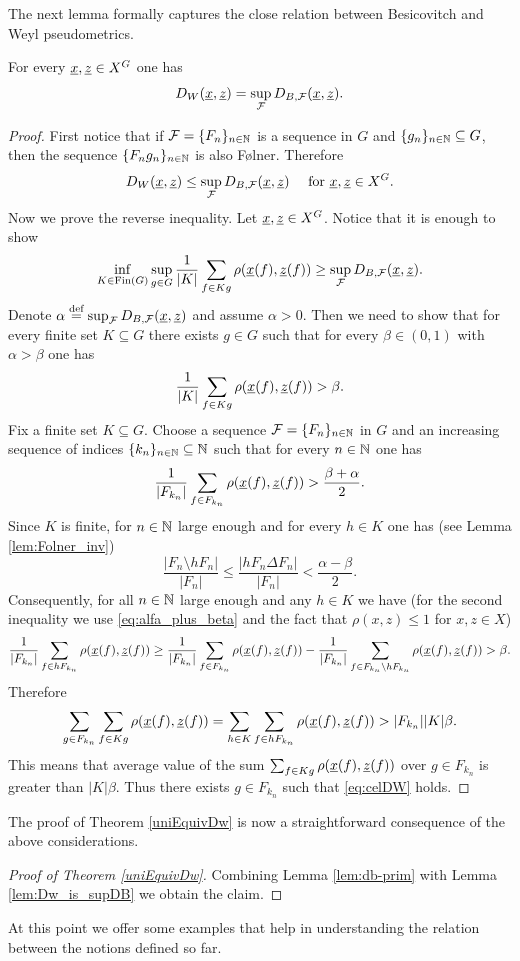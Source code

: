 \noindent The next lemma formally captures the close relation between Besicovitch and Weyl pseudometrics.

\begin{lem}\label{lem:Dw_is_supDB}
For every $\underline{x}, \underline{z}\in X^G$ one has
\[ 
D_W(\underline{x}, \underline{z})=\sup_{\operatorname{\mathcal{F}}}D_{B,\operatorname{\mathcal{F}}}(\underline{x}, \underline{z}).
\]
\end{lem}


\begin{proof}
First notice that if $\operatorname{\mathcal{F}}=\{F_n\}_{n\in\mathbb{N}}$ is a \Folner sequence in $G$ and  $\{g_n\}_{n\in\mathbb{N}}\subseteq G$, then the sequence $\{F_ng_n\}_{n\in\mathbb{N}}$ is also F{\o}lner. Therefore 
\[
D_W(\underline{x}, \underline{z})\leq\sup_{\operatorname{\mathcal{F}}}D_{B,\operatorname{\mathcal{F}}}(\underline{x}, \underline{z}) \quad \text{ for } \underline{x},\underline{z}\in X^G.
\]
Now we prove the reverse inequality. Let $\underline{x},\underline{z}\in X^G$. Notice that it is enough to show
\[
\inf_{K\in\operatorname{Fin}(G)}\sup_{g\in G}\frac{1}{ | K|} \sum_{f\in Kg}\rho(\underline{x}(f), \underline{z}(f)) \geq\sup_{\operatorname{\mathcal{F}}}D_{B,\operatorname{\mathcal{F}}}(\underline{x}, \underline{z}).
\]
Denote $\alpha\stackrel{\textup{def}}{=} \sup_{\operatorname{\mathcal{F}}}D_{B,\operatorname{\mathcal{F}}}(\underline{x}, \underline{z})$ and assume $\alpha>0$. Then we need to show that for every finite set $K\subseteq G$ there exists $g\in G$ such that for every $\beta\in(0,1)$ with $\alpha > \beta$ one has
\begin{equation}\label{eq:celDW}
\frac{1}{ | K|} \sum_{f\in Kg}\rho(\underline{x}(f), \underline{z}(f))>\beta. 
\end{equation}
Fix a finite set $K\subseteq G$. Choose a \Folner sequence $\operatorname{\mathcal{F}}=\{F_n\}_{n\in\mathbb{N}}$ in $G$ and an increasing sequence of indices $\{k_n\}_{n\in\mathbb{N}}\subseteq\mathbb{N}$  such that for every $n\in\mathbb{N}$ one has 
\begin{equation}\label{eq:alfa_plus_beta}
\frac{1}{ | F_{k_n}|} \sum_{f\in F_{k_n}} \rho(\underline{x}(f),\underline{z}(f)) >\frac{\beta+\alpha}{2}.
\end{equation} 
Since $K$ is finite, for $n\in\mathbb{N}$ large enough and for every $h\in K$ one has (see Lemma \ref{lem:Folner_inv})
\[
\frac{|F_n\setminus hF_n|}{|F_n|}\leq \frac{|hF_n\Delta F_n|}{|F_n|} < \frac{\alpha-\beta}{2}.
\]
Consequently, for all $n\in\mathbb{N}$ large enough and any $h\in K$ we have (for the second inequality we use \eqref{eq:alfa_plus_beta} and the fact that $\rho(x,z)\leq 1$ for $x,z\in X$)
\[
\frac{1}{|F_{k_n}|} \sum_{f\in hF_{k_n}} \rho(\underline{x}(f),\underline{z}(f)) \geq \frac{1}{| F_{k_n}|} \sum_{f\in F_{k_n}} \rho(\underline{x}(f),\underline{z}(f)) - \frac{1}{|F_{k_n}|} \sum_{f\in F_{k_n}\setminus hF_{k_n}} \rho(\underline{x}(f),\underline{z}(f)) > \beta.
\]
Therefore
\[
\sum_{g\in F_{k_n}} \sum_{f\in Kg}\rho(\underline{x}(f),\underline{z}(f)) = \sum_{h\in K} \sum_{f\in hF_{k_n}}\rho(\underline{x}(f),\underline{z}(f)) > | F_{k_n}|| K|  \beta.
\]
This means that average value of the sum 
$
\sum_{f\in Kg}\rho(\underline{x}(f),\underline{z}(f)) 
$ over $g\in F_{k_n}$ is greater than $| K|  \beta$. Thus there exists $g\in F_{k_n}$ such that \eqref{eq:celDW} holds.
\end{proof}
\noindent 
The proof of Theorem \ref{uniEquivDw} is now a straightforward consequence of the above considerations.
\begin{proof}[Proof of Theorem \ref{uniEquivDw}]
Combining Lemma \ref{lem:db-prim} with Lemma \ref{lem:Dw_is_supDB} we obtain the claim.
\end{proof}
\noindent 
At this point we offer some examples that help in understanding the relation between the notions defined so far.

